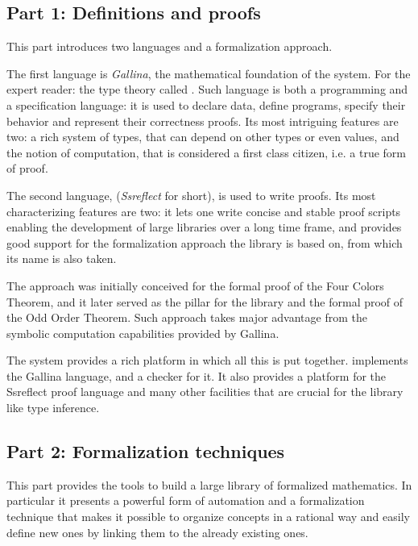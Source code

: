 \subsection{Part 1: Definitions and proofs}

This part introduces two languages and a formalization approach.

The first language is \emph{Gallina}, the mathematical foundation of the \Coq{}
system.  For the expert reader: the type theory called \mcbCIC{}.  Such
language is both a programming and a specification language: it is used to
declare data, define programs, specify their behavior and represent their
correctness proofs.  Its most intriguing features are two: a rich system of
types, that can depend on other types or even values, and the notion of
computation, that is considered a first class citizen, i.e. a true form of
proof.

The second language, \mcbSSR{} (\emph{Ssreflect} for short), is used to write
proofs.  Its most characterizing features are two: it lets one write
concise and stable proof scripts enabling the development of large
libraries over a long time frame, and provides good support for the
formalization approach the \mcbMC{} library is based on, from which
its name is also taken.

The \emph{\mcbSSR{}} approach was initially conceived for the formal proof
of the Four Colors Theorem, and it later served as the pillar for
the \mcbMC{} library and the formal proof of the Odd Order Theorem.
Such approach takes major advantage from the symbolic computation
capabilities provided by Gallina.

The \Coq{} system provides a rich platform in which all this is
put together.  \Coq{} implements the Gallina language, and a checker for it.
It also provides a platform for the Ssreflect proof language and
many other facilities that are crucial for the \mcbMC{} library like
type inference.

\subsection{Part 2: Formalization techniques}

This part provides the tools to build a large library of formalized
mathematics.  In particular it presents a powerful form of automation
and a formalization technique that makes it possible to organize
concepts in a rational way and easily define new ones by linking them
to the already existing ones.

